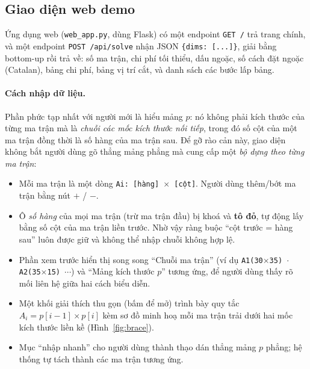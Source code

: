 \documentclass[12pt,a4paper]{article}
\begin{document}
\subsection{Giao diện web demo}
Ứng dụng web (\texttt{web\_app.py}, dùng Flask) có một endpoint \texttt{GET /} trả trang chính, và một endpoint \texttt{POST /api/solve} nhận JSON \texttt{\{dims: [...]\}}, giải bằng bottom-up rồi trả về: số ma trận, chi phí tối thiểu, dấu ngoặc, số cách đặt ngoặc (Catalan), bảng chi phí, bảng vị trí cắt, và danh sách các bước lấp bảng.

\paragraph{Cách nhập dữ liệu.} Phần phức tạp nhất với người mới là hiểu mảng $p$: nó không phải kích thước của từng ma trận mà là \emph{chuỗi các mốc kích thước nối tiếp}, trong đó số cột của một ma trận đồng thời là số hàng của ma trận sau. Để gỡ rào cản này, giao diện không bắt người dùng gõ thẳng mảng phẳng mà cung cấp một \emph{bộ dựng theo từng ma trận}:
\begin{itemize}
  \item Mỗi ma trận là một dòng \texttt{Ai: [hàng] $\times$ [cột]}. Người dùng thêm/bớt ma trận bằng nút $+$ / $-$.
  \item Ô \emph{số hàng} của mọi ma trận (trừ ma trận đầu) bị khoá và \textbf{tô đỏ}, tự động lấy bằng số cột của ma trận liền trước. Nhờ vậy ràng buộc \enquote{cột trước = hàng sau} luôn được giữ và không thể nhập chuỗi không hợp lệ.
  \item Phần xem trước hiển thị song song \enquote{Chuỗi ma trận} (ví dụ \texttt{A1(30$\times$35) $\cdot$ A2(35$\times$15) $\cdots$}) và \enquote{Mảng kích thước $p$} tương ứng, để người dùng thấy rõ mối liên hệ giữa hai cách biểu diễn.
  \item Một khối giải thích thu gọn (bấm để mở) trình bày quy tắc $A_i = p[i{-}1] \times p[i]$ kèm sơ đồ minh hoạ mỗi ma trận trải dưới hai mốc kích thước liền kề (Hình~\ref{fig:brace}).
  \item Mục \enquote{nhập nhanh} cho người dùng thành thạo dán thẳng mảng $p$ phẳng; hệ thống tự tách thành các ma trận tương ứng.
\end{itemize}
\end{document}
